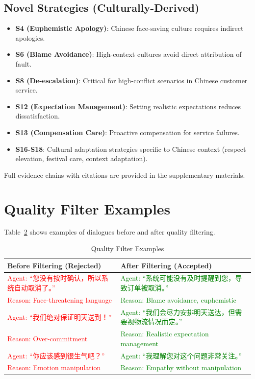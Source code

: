 \documentclass[11pt]{article}
\begin{document}
\begin{table}[t]
\subsection*{Novel Strategies (Culturally-Derived)}
\begin{itemize}
  \item \textbf{S4 (Euphemistic Apology)}: Chinese face-saving culture requires indirect apologies.
  \item \textbf{S6 (Blame Avoidance)}: High-context cultures avoid direct attribution of fault.
  \item \textbf{S8 (De-escalation)}: Critical for high-conflict scenarios in Chinese customer service.
  \item \textbf{S12 (Expectation Management)}: Setting realistic expectations reduces dissatisfaction.
  \item \textbf{S13 (Compensation Care)}: Proactive compensation for service failures.
  \item \textbf{S16-S18}: Cultural adaptation strategies specific to Chinese context (respect elevation, festival care, context adaptation).
\end{itemize}

Full evidence chains with citations are provided in the supplementary materials.

\section{Quality Filter Examples}

Table~\ref{tab:quality_filters} shows examples of dialogues before and after quality filtering.

\begin{table}[h]
\centering
\caption{Quality Filter Examples}
\label{tab:quality_filters}
\small
\begin{tabularx}{\textwidth}{p{}|p{}}
\toprule
\textbf{Before Filtering (Rejected)} & \textbf{After Filtering (Accepted)} \\
\midrule
\textcolor{red}{Agent: ``您没有按时确认，所以系统自动取消了。''} & \textcolor{green}{Agent: ``系统可能没有及时提醒到您，导致订单被取消。''} \\
\textcolor{red}{Reason: Face-threatening language} & \textcolor{green}{Reason: Blame avoidance, euphemistic} \\
\midrule
\textcolor{red}{Agent: ``我们绝对保证明天送到！''} & \textcolor{green}{Agent: ``我们会尽力安排明天送达，但需要视物流情况而定。''} \\
\textcolor{red}{Reason: Over-commitment} & \textcolor{green}{Reason: Realistic expectation management} \\
\midrule
\textcolor{red}{Agent: ``你应该感到很生气吧？''} & \textcolor{green}{Agent: ``我理解您对这个问题非常关注。''} \\
\textcolor{red}{Reason: Emotion manipulation} & \textcolor{green}{Reason: Empathy without manipulation} \\
\bottomrule
\end{tabularx}
\end{table}


\end{table}
\end{document}
